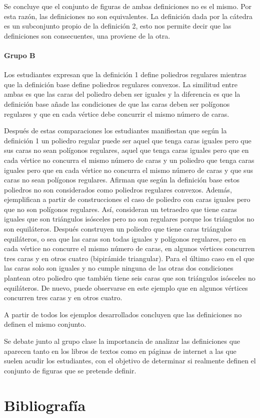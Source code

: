 \documentclass[oneside,spanish]{amsart}
\numberwithin{equation}{section}
\theoremstyle{definition}
\begin{document}
Se concluye que el conjunto de figuras de ambas definiciones no es el mismo. Por esta razón, las definiciones no son equivalentes. La definición dada por la cátedra es un subconjunto propio de la definición 2, esto nos permite decir que las definiciones son consecuentes, una proviene de la otra.

\bigskip
\paragraph{\bfseries Grupo B}

Los estudiantes expresan que la definición 1 define poliedros regulares mientras que la definición base define poliedros regulares convexos. La similitud entre ambas es que las caras del poliedro deben ser iguales y la diferencia es que la definición base añade las condiciones de que las caras deben ser polígonos regulares y que en cada vértice debe concurrir el mismo número de caras.

Después de estas comparaciones los estudiantes manifiestan que según la definición 1 un poliedro regular puede ser aquel que tenga caras iguales pero que sus caras no sean polígonos regulares, aquel que tenga caras iguales pero que en cada vértice no concurra el mismo número de caras y un poliedro que tenga caras iguales pero que en cada vértice no concurra el mismo número de caras y que sus caras no sean polígonos regulares. Afirman que según la definición base estos poliedros no son considerados como poliedros regulares convexos. Además, ejemplifican a partir de construcciones el caso de poliedro con caras iguales pero que no son polígonos regulares. Así, consideran un tetraedro que tiene caras iguales que son triángulos isósceles pero no son regulares porque los triángulos no son equiláteros. Después construyen un poliedro que tiene caras triángulos equiláteros, o sea que las caras son todas iguales y polígonos regulares, pero en cada vértice no concurre el mismo número de caras, en algunos vértices concurren tres caras y en otros cuatro (bipirámide triangular). Para el último caso en el que las caras solo son iguales y no cumple ninguna de las otras dos condiciones plantean otro poliedro que también tiene seis caras que son triángulos isósceles no equiláteros. De nuevo, puede observarse en este ejemplo que en algunos vértices concurren tres caras y en otros cuatro.

A partir de todos los ejemplos desarrollados concluyen que las definiciones no definen el mismo conjunto.

Se debate junto al grupo clase la importancia de analizar las definiciones que aparecen tanto en los libros de textos como en páginas de internet a las que suelen acudir los estudiantes, con el objetivo de determinar si realmente definen el conjunto de figuras que se pretende definir.


\section{Bibliografía}

\nocite{*}
\printbibliography
\end{document}
